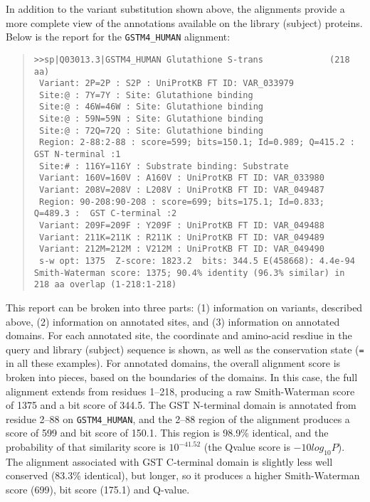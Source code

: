 \documentclass[11pt]{article}
\begin{document}
In addition to the variant substitution shown above, the alignments
provide a more complete view of the annotations available on the
library (subject) proteins.  Below is the report for the
\texttt{GSTM4\_HUMAN} alignment:
\begin{footnotesize}
\begin{quote}
\begin{verbatim}
>>sp|Q03013.3|GSTM4_HUMAN Glutathione S-trans             (218 aa)
 Variant: 2P=2P : S2P : UniProtKB FT ID: VAR_033979
 Site:@ : 7Y=7Y : Site: Glutathione binding
 Site:@ : 46W=46W : Site: Glutathione binding
 Site:@ : 59N=59N : Site: Glutathione binding
 Site:@ : 72Q=72Q : Site: Glutathione binding
 Region: 2-88:2-88 : score=599; bits=150.1; Id=0.989; Q=415.2 :  GST N-terminal :1
 Site:# : 116Y=116Y : Substrate binding: Substrate
 Variant: 160V=160V : A160V : UniProtKB FT ID: VAR_033980
 Variant: 208V=208V : L208V : UniProtKB FT ID: VAR_049487
 Region: 90-208:90-208 : score=699; bits=175.1; Id=0.833; Q=489.3 :  GST C-terminal :2
 Variant: 209F=209F : Y209F : UniProtKB FT ID: VAR_049488
 Variant: 211K=211K : R211K : UniProtKB FT ID: VAR_049489
 Variant: 212M=212M : V212M : UniProtKB FT ID: VAR_049490
 s-w opt: 1375  Z-score: 1823.2  bits: 344.5 E(458668): 4.4e-94
Smith-Waterman score: 1375; 90.4% identity (96.3% similar) in 218 aa overlap (1-218:1-218)
\end{verbatim}
\end{quote}
\end{footnotesize}
This report can be broken into three parts: (1) information on
variants, described above, (2) information on annotated sites, and (3)
information on annotated domains.  For each annotated site, the
coordinate and amino-acid resdiue in the query and library (subject)
sequence is shown, as well as the conservation state (\texttt{=} in
all these examples).  For annotated domains, the overall alignment
score is broken into pieces, based on the boundaries of the domains.
In this case, the full alignment extends from residues 1--218,
producing a raw Smith-Waterman score of 1375 and a bit score of
344.5.  The GST N-terminal domain is annotated from residue 2--88 on
\texttt{GSTM4\_HUMAN}, and the 2--88 region of the alignment produces
a score of 599 and bit score of 150.1.  This region is 98.9\%
identical, and the probability of that similarity score is
$10^{-41.52}$ (the Qvalue score is $-10 log_{10} P$).  The
alignment associated with GST C-terminal domain is slightly less well
conserved (83.3\% identical), but longer, so it produces a higher
Smith-Waterman score (699), bit score (175.1) and Q-value.
\end{document}
